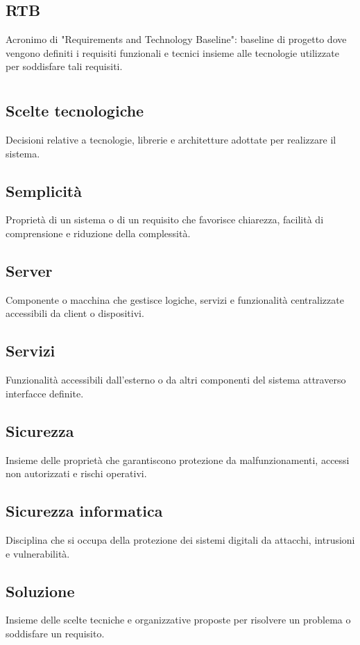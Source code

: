\documentclass[a4paper,12pt]{article}
\begin{document}
          \subsection*{RTB}
			Acronimo di "Requirements and Technology Baseline": baseline di progetto dove vengono definiti i requisiti funzionali e tecnici insieme alle tecnologie utilizzate per soddisfare tali requisiti.
        
\newpage
      
        \section{}
        
          \subsection*{Scelte tecnologiche}
			Decisioni relative a tecnologie, librerie e architetture adottate per realizzare il sistema.
          \subsection*{Semplicità}
			Proprietà di un sistema o di un requisito che favorisce chiarezza, facilità di comprensione e riduzione della complessità.
          \subsection*{Server}
			Componente o macchina che gestisce logiche, servizi e funzionalità centralizzate accessibili da client o dispositivi.
          \subsection*{Servizi}
			Funzionalità accessibili dall'esterno o da altri componenti del sistema attraverso interfacce definite.
          \subsection*{Sicurezza}
			Insieme delle proprietà che garantiscono protezione da malfunzionamenti, accessi non autorizzati e rischi operativi.
          \subsection*{Sicurezza informatica}
			Disciplina che si occupa della protezione dei sistemi digitali da attacchi, intrusioni e vulnerabilità.
          \subsection*{Soluzione}
			Insieme delle scelte tecniche e organizzative proposte per risolvere un problema o soddisfare un requisito.
\end{document}
